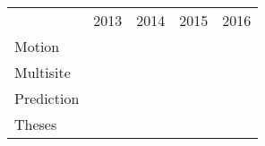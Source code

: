 \begin{table}[H]\label{timeline}
\centering
\begin{tabular}{lllllllll}
 & \multicolumn{2}{l}{2013}& \multicolumn{2}{l}{2014}& \multicolumn{2}{l}{2015}& \multicolumn{2}{l}{2016}\\
 Motion & \cellcolor{black!25}& \cellcolor{black!25}&  \cellcolor{black!25}& \cellcolor{black!25}& & & & \\
 Multisite & \cellcolor{black!25}& \cellcolor{black!25}&  \cellcolor{black!25} & \cellcolor{black!25}& \cellcolor{black!25}& & & \\
 Prediction & & & & \cellcolor{black!25}& \cellcolor{black!25}&  \cellcolor{black!25}& \cellcolor{black!25}& \\
 Theses & & & & & & & & \cellcolor{black!25} \\
\end{tabular}
\end{table}

